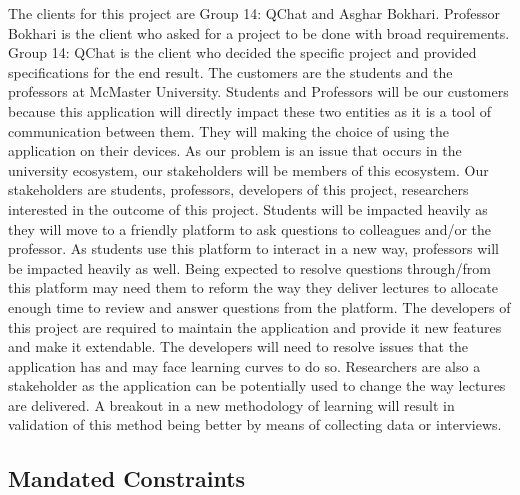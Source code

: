 \documentclass[12pt, titlepage]{article}
\begin{document}
The clients for this project are Group 14: QChat and Asghar Bokhari. Professor Bokhari is the client who asked for a project to be done with broad requirements. Group 14: QChat is the client who decided the specific project and provided specifications for the end result. The customers are the students and the professors at McMaster University. Students and Professors will be our customers because this application will directly impact these two entities as it is a tool of communication between them. They will making the choice of using the application on their devices. As our problem is an issue that occurs in the university ecosystem, our stakeholders will be members of this ecosystem. Our stakeholders are students, professors, developers of this project, researchers interested in the outcome of this project. Students will be impacted heavily as they will move to a friendly platform to ask questions to colleagues and/or the professor. As students use this platform to interact in a new way, professors will be impacted heavily as well. Being expected to resolve questions through/from this platform may need them to reform the way they deliver lectures to allocate enough time to review and answer questions from the platform. The developers of this project are required to maintain the application and provide it new features and make it extendable. The developers will need to resolve issues that the application has and may face learning curves to do so. Researchers are also a stakeholder as the application can be potentially used to change the way lectures are delivered. A breakout in a new methodology of learning will result in validation of this method being better by means of collecting data or interviews. 

\subsection{Mandated Constraints}
\end{document}
